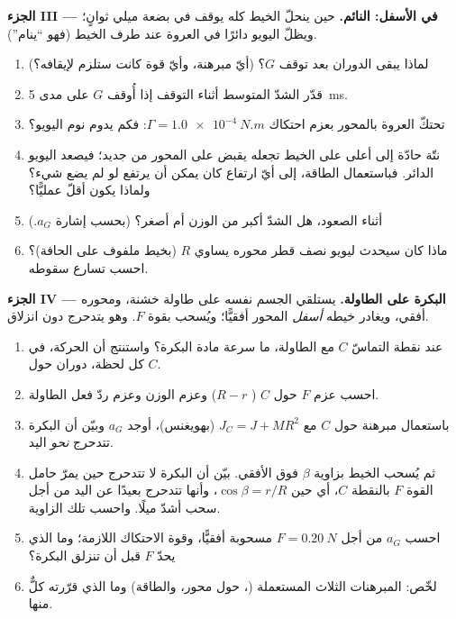 \begin{problem}
\medskip
\noindent\textbf{الجزء III --- في الأسفل: النائم.}
حين ينحلّ الخيط كله يوقف  في بضعة
ميلي ثوانٍ؛ ويظلّ اليويو دائرًا في العروة عند طرف
الخيط (فهو ``ينام'').
\begin{enumerate}[resume]
  \item لماذا يبقى الدوران بعد توقف $G$؟ (أيّ مبرهنة، وأيّ
        قوة كانت ستلزم لإيقافه؟)
  \item قدّر الشدّ المتوسط أثناء التوقف إذا أُوقف $G$
        على مدى \qty{5}{ms}.
  \item تحتكّ العروة بالمحور بعزم احتكاك $\Gamma =
        \qty{1.0e-4}{N.m}$: فكم يدوم نوم اليويو؟
  \item نتّة حادّة إلى أعلى على الخيط تجعله يقبض على المحور
        من جديد؛ فيصعد اليويو الدائر. فباستعمال الطاقة، إلى أيّ
        ارتفاع كان يمكن أن يرتفع لو لم يضع شيء؟ ولماذا يكون أقلّ
        عمليًّا؟
  \item أثناء الصعود، هل الشدّ أكبر من الوزن أم أصغر؟ (بحسب
        إشارة $a_G$.)
  \item ماذا كان سيحدث ليويو نصف قطر محوره يساوي $R$
        (بخيط ملفوف على الحافة)؟ احسب تسارع سقوطه.
\end{enumerate}

\medskip
\noindent\textbf{الجزء IV --- البكرة على الطاولة.}
يستلقي الجسم نفسه على طاولة خشنة، ومحوره أفقي، ويغادر خيطه
\emph{أسفل} المحور أفقيًّا؛ ويُسحب بقوة
$F$. وهو يتدحرج دون انزلاق.
\begin{enumerate}[resume]
  \item عند نقطة التماسّ $C$ مع الطاولة، ما سرعة
        مادة البكرة؟ واستنتج أن الحركة، في كل
        لحظة، دوران حول $C$.
  \item احسب عزم $F$ حول $C$ ( $R - r$) وعزم
        الوزن وعزم ردّ فعل الطاولة.
  \item باستعمال مبرهنة  حول $C$ مع $J_C = J +
        MR^2$ (بهويغنس)، أوجد $a_G$ وبيّن أن البكرة تتدحرج
        \emph{نحو} اليد.
  \item ثم يُسحب الخيط بزاوية $\beta$ فوق
        الأفقي. بيّن أن البكرة لا تتدحرج حين يمرّ حامل
        القوة $F$ بالنقطة $C$، أي حين $\cos\beta = r/R$، وأنها
        تتدحرج بعيدًا عن اليد من أجل سحب أشدّ ميلًا. واحسب تلك الزاوية.
  \item احسب $a_G$ من أجل $F = \qty{0.20}{N}$ مسحوبة أفقيًّا، وقوة
        الاحتكاك اللازمة؛ وما الذي يحدّ $F$ قبل أن تنزلق البكرة؟
  \item لخّص: المبرهنات الثلاث المستعملة (،  حول محور، والطاقة) وما الذي قرّرته كلٌّ منها.
\end{enumerate}
\end{problem}
